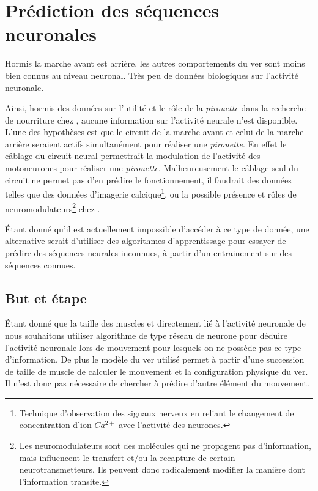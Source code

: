 \chapter{Prédiction des séquences neuronales} %
\label{cha:Prédire des séquences neuronales}

Hormis la marche avant est arrière, les autres comportements du ver sont moins
bien connus au niveau neuronal. Très peu de données biologiques sur l'activité
neuronale.

Ainsi, hormis des données sur l'utilité et le rôle de la \textit{pirouette}
dans la recherche de nourriture chez \celeg{}\cite{Gray2005}, aucune
information sur l'activité neurale n'est disponible. L'une des hypothèses
est que le circuit de la marche avant et celui de la marche arrière seraient
actifs simultanément pour réaliser une \textit{pirouette}. En effet le câblage
du circuit neural permettrait la modulation de l'activité des motoneurones pour
réaliser une \textit{pirouette}. Malheureusement le câblage seul du circuit ne
permet pas d'en prédire le fonctionnement, il faudrait des données telles que
des données d'imagerie calcique\footnote{Technique d'observation des signaux
nerveux en reliant le changement de concentration d'ion $Ca^{2+}$ avec
l'activité des neurones.}, ou la possible présence et rôles de
neuromodulateurs\footnote{Les neuromodulateurs sont des molécules qui ne
propagent pas d'information, mais influencent le transfert et/ou la recapture
de certain neurotransmetteurs. Ils peuvent donc radicalement modifier la
manière dont l'information transite.} chez \celeg{}.

Étant donné qu'il est actuellement impossible d'accéder à ce type de donnée, une
alternative serait d'utiliser des algorithmes d'apprentissage pour essayer de
prédire des séquences neurales inconnues, à partir d'un entrainement sur des
séquences connues.

\section{But et étape} %
\label{sec:But et étape}

Étant donné que la taille des muscles et directement lié à l'activité neuronale
de \celeg{} nous souhaitons utiliser algorithme de type réseau de neurone pour
déduire l'activité neuronale lors de mouvement pour lesquels on ne possède pas
ce type d'information. De plus le modèle du ver utilisé permet à partir d'une
succession de taille de muscle de calculer le mouvement et la configuration
physique du ver. Il n'est donc pas nécessaire de chercher à prédire d'autre
élément du mouvement.

